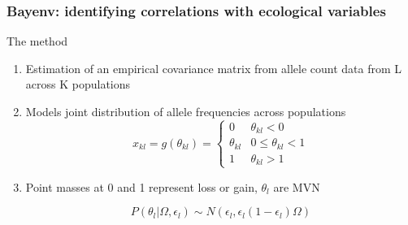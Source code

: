 \begin{frame}
\frametitle{Bayenv: identifying correlations with ecological
variables}
\begin{block}{The method}
\begin{enumerate}
\item{Estimation of an empirical covariance matrix from allele count data from
L across K populations}
\item{Models joint distribution of allele frequencies across populations}
\begin{equation}
x_{kl} = g(\theta_{kl}) = \begin{cases}
	0 & \theta_{kl} < 0 \\
	\theta_{kl} & 0 \le \theta_{kl} < 1 \\
	1 & \theta_{kl} > 1
\end{cases}	
\end{equation}
\item{Point masses at 0 and 1 represent loss or gain, $\theta_l$ are MVN}

\begin{equation}
	P(\theta_l|\Omega, \epsilon_l) \sim
 N(\epsilon_l,\epsilon_l(1-\epsilon_l)\Omega)
\end{equation}

\end{enumerate}

\end{block}
\end{frame}

